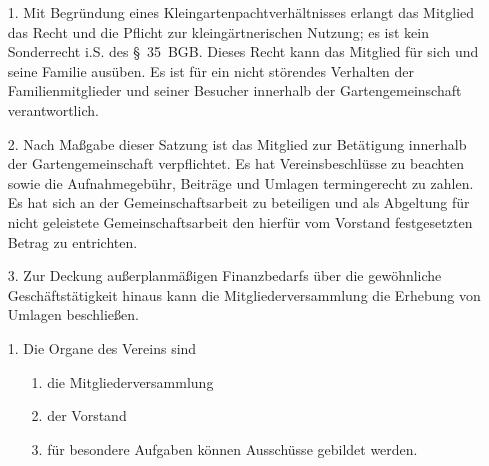 \documentclass{scrartcl}
\begin{document}
\begin{itemize}
	\item[1.] Mit Begründung eines Kleingartenpachtverhältnisses erlangt das Mitglied
	          das Recht und die Pflicht zur kleingärtnerischen Nutzung; es ist kein
	 		  Sonderrecht i.S. des §~35~BGB. Dieses Recht kann das Mitglied für sich und
	 		  seine Familie ausüben. Es ist für ein nicht störendes Verhalten der
	 		  Familienmitglieder und seiner Besucher innerhalb der Gartengemeinschaft
	 		  verantwortlich.
	\item[2.] Nach Maßgabe dieser Satzung ist das Mitglied zur Betätigung innerhalb der
	 		  Gartengemeinschaft verpflichtet. Es hat Vereinsbeschlüsse zu beachten
	 		  sowie die Aufnahmegebühr, Beiträge und Umlagen termingerecht zu zahlen. Es
	 		  hat sich an der Gemeinschaftsarbeit zu beteiligen und als Abgeltung für
	 		  nicht geleistete Gemeinschaftsarbeit den hierfür vom Vorstand
	 		  festgesetzten Betrag zu entrichten.
	\item[3.] Zur Deckung außerplanmäßigen Finanzbedarfs über die gewöhnliche
			  Geschäftstätigkeit hinaus kann die Mitgliederversammlung die Erhebung von
			  Umlagen beschließen.
\end{itemize}

\pagebreak
{}

\begin{itemize}
\item[1.] Die Organe des Vereins sind
	\begin{itemize}
	 	\item[1.] die Mitgliederversammlung
	 	\item[2.] der Vorstand
	 	\item[3.] für besondere Aufgaben können Ausschüsse gebildet werden.
	 \end{itemize} 
\end{itemize}


\end{document}
